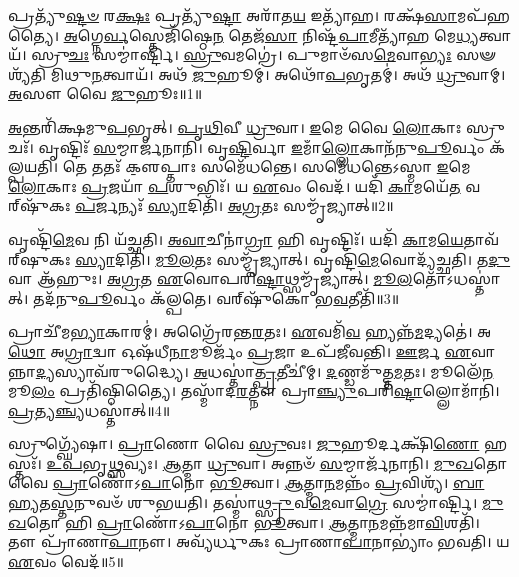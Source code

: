 \setcounter{anuvakam}{0}

𑌪𑍍𑌰𑌤𑍍𑌯𑍁᳴\-\ul{𑌷𑍍𑌟}\-\-\ul{𑍞} 𑌰\-\ul{𑌕𑍍𑌷𑌃} 𑌪𑍍𑌰𑌤𑍍𑌯𑍁᳴\-\ul{𑌷𑍍𑌟𑌾} 𑌅𑌰𑌾᳴𑌤\-\ul{𑌯} 𑌇𑌤𑍍𑌯𑌾᳴𑌹।
𑌰𑌕𑍍𑌷᳴\-\ul{𑌸𑌾}\-𑌮𑌪᳴𑌹𑌤𑍍𑌯𑍈।
\-\ul{𑌅}\-𑌗𑍍𑌨𑍇\-\ul{𑌰𑍍𑌵}\-𑌸𑍍𑌤𑍇𑌜𑌿᳴𑌷𑍍𑌠𑍇\-\ul{𑌨} 𑌤𑍇𑌜᳴\-\ul{𑌸𑌾} 𑌨𑌿𑌷𑍍𑌟᳴\-\ul{𑌪𑌾}\-𑌮𑍀𑌤𑍍𑌯𑌾᳴𑌹 𑌮𑍇\-\ul{𑌧𑍍𑌯}\-𑌤𑍍𑌵𑌾𑌯᳴।
𑌸𑍍𑌰𑍁\-\ul{𑌚𑌃} 𑌸𑌮𑍍𑌮𑌾॑𑌰𑍍𑌷𑍍𑌟𑌿।
\-\ul{𑌸𑍍𑌰𑍁}\-𑌵𑌮𑌗𑍍𑌰𑍇॑।
𑌪𑍁𑌮𑌾𑍞᳴𑌸\-\ul{𑌮𑍇}\-𑌵𑌾\-\ul{𑌭𑍍𑌯𑌃} 𑌸𑍟𑌶𑍍𑌯᳴𑌤𑌿 𑌮𑌿𑌥𑍁\-\ul{𑌨}\-𑌤𑍍𑌵𑌾𑌯᳴।
𑌅𑌥᳴ \ul{𑌜𑍁}\-𑌹𑍂𑌮𑍍।
𑌅𑌥𑍋᳴\-\ul{𑌪}\-𑌭𑍃𑌤𑌮𑍍॑।
𑌅𑌥᳴ \ul{𑌧𑍍𑌰𑍁}\-𑌵𑌾𑌮𑍍।
\-\ul{𑌅}\-𑌸𑍗 𑌵𑍈 \ul{𑌜𑍁}\-𑌹𑍂𑌃॥1॥

\-\ul{𑌅}\-𑌨𑍍𑌤𑌰𑌿᳴𑌕𑍍𑌷𑌮𑍁\-\ul{𑌪}\-𑌭𑍃𑌤𑍍।
\-\ul{𑌪𑍃}\-\-\ul{𑌥𑌿}\-𑌵𑍀 \ul{𑌧𑍍𑌰𑍁}\-𑌵𑌾।
\-\ul{𑌇}\-𑌮𑍇 𑌵𑍈 \ul{𑌲𑍋}\-𑌕𑌾𑌃 𑌸𑍍𑌰𑍁𑌚𑌃᳴।
𑌵𑍃𑌷𑍍𑌟𑌿𑌃᳴ \ul{𑌸}\-𑌮𑍍𑌮𑌾𑌰𑍍𑌜᳴𑌨𑌾𑌨𑌿।
𑌵𑍃\-\ul{𑌷𑍍𑌟𑌿}\-𑌰𑍍𑌵𑌾 \ul{𑌇}\-𑌮𑌾𑌁\-\ul{𑌲𑍍𑌲𑍋}\-𑌕𑌾𑌨᳴𑌨𑍁\-\ul{𑌪𑍂}\-𑌰𑍍𑌵𑌂 𑌕᳴𑌲𑍍𑌪𑌯𑌤𑌿।
𑌤𑍇 𑌤𑌤𑌃᳴ 𑌕𑍢॒𑌪𑍍𑌤𑌾𑌃 𑌸𑌮𑍇᳴𑌧𑌨𑍍𑌤𑍇।
𑌸𑌮𑍇᳴𑌧𑌨𑍍𑌤𑍇\-𑌽𑌸𑍍𑌮𑌾 \ul{𑌇}\-𑌮𑍇 \ul{𑌲𑍋}\-𑌕𑌾𑌃 \ul{𑌪𑍍𑌰}\-𑌜𑌯𑌾᳴ \ul{𑌪}\-𑌶𑍁𑌭𑌿𑌃᳴।
𑌯 \ul{𑌏}\-𑌵𑌂 𑌵𑍇𑌦᳴।
𑌯𑌦𑌿᳴ \ul{𑌕𑌾}\-𑌮𑌯𑍇᳴\-\ul{𑌤} 𑌵𑌰𑍍‌\mbox{}𑌷𑍁᳴𑌕𑌃 \ul{𑌪}\-𑌰𑍍𑌜𑌨𑍍𑌯𑌃᳴ \ul{𑌸𑍍𑌯𑌾}\-𑌦𑌿𑌤𑌿᳴।
\-\ul{𑌅}\-\-\ul{𑌗𑍍𑌰}\-𑌤𑌃 𑌸𑌮𑍍𑌮𑍃᳴𑌜𑍍𑌯𑌾𑌤𑍍॥2॥

𑌵𑍃𑌷𑍍𑌟𑌿᳴\-\ul{𑌮𑍇}\-𑌵 𑌨𑌿 𑌯᳴𑌚𑍍𑌛𑌤𑌿।
\-\ul{𑌅}\-\-\ul{𑌵𑌾}\-𑌚𑍀𑌨𑌾॑\-\ul{𑌗𑍍𑌰𑌾} 𑌹𑌿 𑌵𑍃𑌷𑍍𑌟𑌿𑌃᳴।
𑌯𑌦𑌿᳴ \ul{𑌕𑌾}\-𑌮\-\ul{𑌯𑍇}\-𑌤𑌾𑌵᳴𑌰𑍍‌\mbox{}𑌷𑍁𑌕𑌃 \ul{𑌸𑍍𑌯𑌾}\-𑌦𑌿𑌤𑌿᳴।
\-\ul{𑌮𑍂}\-\-\ul{𑌲}\-𑌤𑌃 𑌸𑌮𑍍𑌮𑍃᳴𑌜𑍍𑌯𑌾𑌤𑍍।
𑌵𑍃𑌷𑍍𑌟𑌿᳴\-\ul{𑌮𑍇}\-𑌵𑍋𑌦𑍍𑌯᳴𑌚𑍍𑌛𑌤𑌿।
𑌤\-\ul{𑌦𑍁} 𑌵𑌾 𑌆᳴𑌹𑍁𑌃।
\-\ul{𑌅}\-\-\ul{𑌗𑍍𑌰}\-𑌤 \ul{𑌏}\-𑌵𑍋𑌪𑌰𑌿᳴\-\ul{𑌷𑍍𑌟𑌾}\-𑌥𑍍𑌸𑌮𑍍𑌮𑍃᳴\-𑌜𑍍𑌯𑌾𑌤𑍍।
\-\ul{𑌮𑍂}\-\-\ul{𑌲}\-𑌤𑍋᳴\-𑌽𑌧𑌸𑍍𑌤𑌾॑𑌤𑍍।
𑌤𑌦᳴𑌨𑍁\-\ul{𑌪𑍂}\-𑌰𑍍𑌵𑌂 𑌕᳴𑌲𑍍𑌪𑌤𑍇।
𑌵𑌰𑍍‌\mbox{}𑌷𑍁᳴𑌕𑍋 𑌭\-\ul{𑌵}\-𑌤𑍀𑌤𑌿᳴॥3॥

𑌪𑍍𑌰𑌾𑌚𑍀᳴𑌮\-\ul{𑌭𑍍𑌯𑌾}\-𑌕𑌾𑌰𑌮𑍍॑।
𑌅𑌗𑍍𑌰𑍈᳴𑌰𑌨𑍍𑌤\-\ul{𑌰}\-𑌤𑌃।
\-\ul{𑌏}\-𑌵𑌮𑌿᳴\-\ul{𑌵} 𑌹𑍍𑌯𑌨𑍍𑌨᳴\-\ul{𑌮}\-𑌦𑍍𑌯𑌤𑍇॑।
𑌅\-\ul{𑌥𑍋} 𑌅\-\ul{𑌗𑍍𑌰𑌾}\-𑌦𑍍𑌵𑌾 𑌓𑌷᳴𑌧𑍀\-\ul{𑌨𑌾}\-𑌮𑍂𑌰𑍍𑌜𑌂᳴ \ul{𑌪𑍍𑌰}\-𑌜𑌾 𑌉𑌪᳴𑌜𑍀𑌵𑌨𑍍𑌤𑌿।
\-\ul{𑌊}\-𑌰𑍍𑌜 \ul{𑌏}\-𑌵𑌾𑌨𑍍𑌨𑌾\-\ul{𑌦𑍍𑌯}\-𑌸𑍍𑌯𑌾𑌵᳴𑌰𑍁𑌦𑍍𑌧𑍍𑌯𑍈।
\-\ul{𑌅}\-𑌧𑌸𑍍𑌤𑌾॑\-\ul{𑌤𑍍𑌪𑍍𑌰}\-𑌤𑍀𑌚𑍀॑𑌮𑍍।
\-\ul{𑌦}\-𑌣𑍍𑌡𑌮𑍁᳴𑌤𑍍𑌤\-\ul{𑌮}\-𑌤𑌃।
𑌮𑍂𑌲𑍇᳴\-\ul{𑌨} 𑌮𑍂\-\ul{𑌲𑌂} 𑌪𑍍𑌰𑌤𑌿᳴\-𑌷𑍍𑌠𑌿𑌤𑍍𑌯𑍈।
𑌤𑌸𑍍𑌮𑌾᳴𑌦\-\ul{𑌰}\-𑌤𑍍𑌨𑍗 𑌪𑍍𑌰𑌾\-\ul{𑌞𑍍𑌚𑍍𑌯𑍁}\-𑌪𑌰𑌿᳴\-\ul{𑌷𑍍𑌟𑌾}\-𑌲𑍍𑌲𑍋𑌮𑌾᳴𑌨𑌿।
\-\ul{𑌪𑍍𑌰}\-𑌤𑍍𑌯\-\ul{𑌞𑍍𑌚𑍍𑌯}\-𑌧𑌸𑍍𑌤𑌾॑𑌤𑍍॥4॥

𑌸𑍍𑌰𑍁𑌗𑍍𑌘𑍍𑌯𑍇᳴𑌷𑌾।
\-\ul{𑌪𑍍𑌰𑌾}\-𑌣𑍋 𑌵𑍈 \ul{𑌸𑍍𑌰𑍁}\-𑌵𑌃।
\-\ul{𑌜𑍁}\-𑌹𑍂𑌰𑍍𑌦𑌕𑍍𑌷𑌿᳴\-\ul{𑌣𑍋} 𑌹𑌸𑍍𑌤𑌃᳴।
\-\ul{𑌉}\-\-\ul{𑌪}\-𑌭𑍃\-\ul{𑌥𑍍𑌸}\-𑌵𑍍𑌯𑌃।
\-\ul{𑌆}\-𑌤𑍍𑌮𑌾 \ul{𑌧𑍍𑌰𑍁}\-𑌵𑌾।
𑌅𑌨𑍍𑌨𑍞᳴ \ul{𑌸}\-𑌮𑍍𑌮𑌾𑌰𑍍𑌜᳴𑌨𑌾𑌨𑌿।
\-\ul{𑌮𑍁}\-\-\ul{𑌖}\-𑌤𑍋 𑌵𑍈 \ul{𑌪𑍍𑌰𑌾}\-𑌣𑍋᳴\-𑌽\-\ul{𑌪𑌾}\-𑌨𑍋 \ul{𑌭𑍂}\-𑌤𑍍𑌵𑌾।
\-\ul{𑌆}\-𑌤𑍍𑌮𑌾\-\ul{𑌨}\-𑌮𑌨𑍍𑌨𑌂᳴ \ul{𑌪𑍍𑌰}\-𑌵𑌿𑌶𑍍𑌯᳴।
\-\ul{𑌬𑌾}\-\-\ul{𑌹𑍍𑌯}\-𑌤\-\ul{𑌸𑍍𑌤}\-𑌨𑍁𑌵𑍞᳴ 𑌶𑍁𑌭𑌯𑌤𑌿।
𑌤𑌸𑍍𑌮𑌾॑\-\ul{𑌥𑍍𑌸𑍍𑌰𑍁}\-𑌵\-\ul{𑌮𑍇}\-𑌵𑌾\-\ul{𑌗𑍍𑌰𑍇} 𑌸𑌮𑍍𑌮𑌾॑𑌰𑍍𑌷𑍍𑌟𑌿।
\-\ul{𑌮𑍁}\-\-\ul{𑌖}\-𑌤𑍋 𑌹𑌿 \ul{𑌪𑍍𑌰𑌾}\-𑌣𑍋᳴\-𑌽\-\ul{𑌪𑌾}\-𑌨𑍋 \ul{𑌭𑍂}\-𑌤𑍍𑌵𑌾।
\-\ul{𑌆}\-𑌤𑍍𑌮𑌾\-\ul{𑌨}\-𑌮𑌨𑍍𑌨᳴𑌮𑌾\-\ul{𑌵𑌿}\-𑌶𑌤𑌿᳴।
𑌤𑍗 𑌪𑍍𑌰𑌾᳴𑌣𑌾\-\ul{𑌪𑌾}\-𑌨𑍗।
𑌅𑌵𑍍𑌯᳴𑌰𑍍𑌧𑍁𑌕𑌃 𑌪𑍍𑌰𑌾𑌣𑌾\-\ul{𑌪𑌾}\-𑌨𑌾𑌭𑍍𑌯𑌾𑌂॑ 𑌭𑌵𑌤𑌿।
𑌯 \ul{𑌏}\-𑌵𑌂 𑌵𑍇𑌦᳴॥5॥\anuvakamend[\-\ul{𑌜𑍁}\-𑌹𑍂𑌰𑍍𑌮𑍃᳴𑌜𑍍𑌯𑌾𑌦𑍍𑌭\-\ul{𑌵}\-𑌤𑍀𑌤𑌿᳴ \ul{𑌪𑍍𑌰}\-𑌤𑍍𑌯\-\ul{𑌞𑍍𑌚𑍍𑌯}\-𑌧𑌸𑍍𑌤𑌾॑𑌨𑍍𑌮𑌾\-\ul{𑌰𑍍𑌷𑍍𑌟𑌿} 𑌪𑌞𑍍𑌚᳴ 𑌚]

